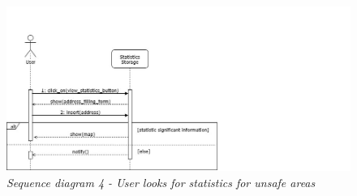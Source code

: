 \begin{figure}[H]
    \centering
    \includegraphics[width=\textwidth]{RASD_Images/SequenceDiagrams/4.jpg}
    \caption{\textit{Sequence diagram 4 - User looks for statistics for unsafe areas}}
\end{figure}


